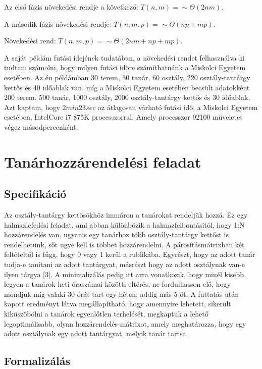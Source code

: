 \documentclass[12pt,a4paper]{report}
\begin{document}
Az első fázis növekedési rendje a következő: $T(n,m)=\sim \Theta (2nm).$

A második fázis növekedési rendje: $T(n,m,p)=\sim \Theta (np+mp).$

Növekedési rend: $T(n,m,p)=\sim \Theta (2nm+np+mp).$

A saját példám futási idejének tudatában, a növekedési rendet felhasználva ki tudtam számolni, hogy milyen futási időre számíthatnánk a Miskolci Egyetem esetében. Az én példámban 30 terem, 30 tanár, 60 osztály, 220 osztály-tantárgy kettős és 40 időablak van, míg a Miskolci Egyetem esetében becsült adatokként 200 terem, 500 tanár, 1000 osztály, 2000 osztály-tantárgy kettős és 30 időablak. Azt kaptam, hogy $2min 23sec$ az átlagosan várható futási idő, a Miskolci Egyetem esetében, IntelCore i7 875K processzorral. Amely processzor 92100 műveletet végez másodpercenként.

\section{Tanárhozzárendelési feladat}

\subsection{Specifikáció}

Az osztály-tantárgy kettősökhöz immáron a tanárokat rendeljük hozzá. Ez egy halmazlefedési feladat, ami abban különbözik a halmazfelbontásitól, hogy 1:N hozzárendelés van, ugyanis egy tanárhoz több osztály-tantárgy kettőst is rendelhetünk, sőt ugye kell is többet hozzárendelni. A párosításmátrixban két feltételtől is függ, hogy 0 vagy 1 kerül a rublikába. Egyrészt, hogy az adott tanár tudja-e tanítani az adott tantárgyat, másrészt hogy az adott osztálynak van-e ilyen tárgya [3]. A minimalizálás pedig itt arra vonatkozik, hogy minél kisebb legyen a tanárok heti óraszámai közötti eltérés, ne fordulhasson elő, hogy mondjuk míg valaki 30 órát tart egy héten, addig más 5-öt.
A futtatás után kapott eredményt látva megállapítható, hogy amennyire lehetett, sikerült kiküszöbölni a tanárok egyenlőtlen terhelését, megkaptuk a lehető legoptimálisabb, olyan hozzárendelés-mátrixot, amely meghatározza, hogy egy adott osztálynak egy adott tantárgyat, melyik tanár tartsa.

\subsection{Formalizálás}
\end{document}
